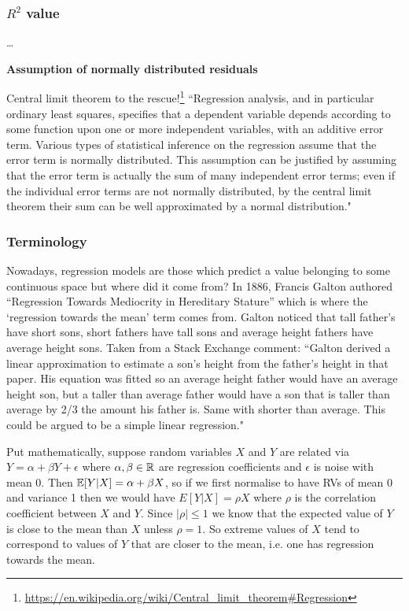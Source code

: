 \documentclass[11pt]{article}
\begin{document}
\subsubsection{$R^2$ value}
\dots

\begin{tcolorbox}[colback=c2]
    \textbf{Assumption of normally distributed residuals}
    \vspace{10pt}

    Central limit theorem to the rescue!\footnote{\url{https://en.wikipedia.org/wiki/Central\_limit\_theorem\#Regression}} ``Regression analysis, and in particular ordinary least squares, specifies that a dependent variable depends according to some function upon one or more independent variables, with an additive error term. Various types of statistical inference on the regression assume that the error term is normally distributed. This assumption can be justified by assuming that the error term is actually the sum of many independent error terms; even if the individual error terms are not normally distributed, by the central limit theorem their sum can be well approximated by a normal distribution."
\end{tcolorbox}

\subsubsection{Terminology}

Nowadays, regression models are those which predict a value belonging to some continuous space but where did it come from? In 1886, Francis Galton authored ``Regression Towards Mediocrity in Hereditary Stature'' which is where the `regression towards the mean' term comes from. Galton noticed that tall father's have short sons, short fathers have tall sons and average height fathers have average height sons. Taken from a Stack Exchange comment: ``Galton derived a linear approximation to estimate a son's height from the father's height in that paper. His equation was fitted so an average height father would have an average height son, but a taller than average father would have a son that is taller than average by 2/3 the amount his father is. Same with shorter than average. This could be argued to be a simple linear regression."

Put mathematically, suppose random variables $X$ and $Y$ are related via $Y=\alpha+\beta Y+\epsilon$ where $\alpha,\beta\in\mathbb{R}$ are regression coefficients and $\epsilon$ is noise with mean $0$. Then $\mathbb{E}[Y|X]=\alpha+\beta X$, so if we first normalise to have RVs of mean 0 and variance 1 then we would have $E[Y|X]=\rho X$ where $\rho$ is the correlation coefficient between $X$ and $Y$. Since $|\rho|\leq1$ we know that the expected value of $Y$ is close to the mean than $X$ unless $\rho=1$. So extreme values of $X$ tend to correspond to values of $Y$ that are closer to the mean, i.e. one has regression towards the mean.
\end{document}
